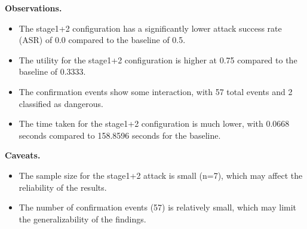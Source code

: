 \documentclass[11pt,a4paper]{article}
\begin{document}
\textbf{Observations.}
\begin{itemize}
\item The stage1+2 configuration has a significantly lower attack success rate (ASR) of 0.0 compared to the baseline of 0.5.
\item The utility for the stage1+2 configuration is higher at 0.75 compared to the baseline of 0.3333.
\item The confirmation events show some interaction, with 57 total events and 2 classified as dangerous.
\item The time taken for the stage1+2 configuration is much lower, with 0.0668 seconds compared to 158.8596 seconds for the baseline.
\end{itemize}
\textbf{Caveats.}
\begin{itemize}
\item The sample size for the stage1+2 attack is small (n=7), which may affect the reliability of the results.
\item The number of confirmation events (57) is relatively small, which may limit the generalizability of the findings.
\end{itemize}
\end{document}
